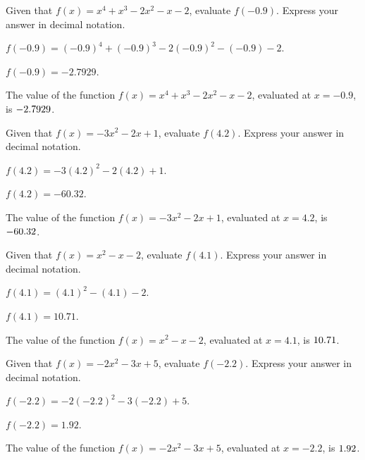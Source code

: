 \begin{shuffle}
\begin{exercise}
Given that $f(x)=x^4+x^3-2 x^2-x-2$, evaluate $f(-0.9)$. Express your answer in decimal notation.
\begin{solution}
\begin{hint}
$f(-0.9)=(-0.9)^4+(-0.9)^3-2 (-0.9)^2-(-0.9)-2$.
\end{hint}
\begin{hint}
$f(-0.9)=-2.7929$.
\end{hint}
The value of the function $f(x) = x^4+x^3-2 x^2-x-2$, evaluated at $x=-0.9$, is ${-2.7929}$.
\end{solution}
\end{exercise}

\begin{exercise}
Given that $f(x)=-3 x^2-2 x+1$, evaluate $f(4.2)$. Express your answer in decimal notation.
\begin{solution}
\begin{hint}
$f(4.2)=-3 (4.2)^2-2 (4.2)+1$.
\end{hint}
\begin{hint}
$f(4.2)=-60.32$.
\end{hint}
The value of the function $f(x) = -3 x^2-2 x+1$, evaluated at $x=4.2$, is ${-60.32}$.
\end{solution}
\end{exercise}

\begin{exercise}
Given that $f(x)=x^2-x-2$, evaluate $f(4.1)$. Express your answer in decimal notation.
\begin{solution}
\begin{hint}
$f(4.1)=(4.1)^2-(4.1)-2$.
\end{hint}
\begin{hint}
$f(4.1)=10.71$.
\end{hint}
The value of the function $f(x) = x^2-x-2$, evaluated at $x=4.1$, is ${10.71}$.
\end{solution}
\end{exercise}

\begin{exercise}
Given that $f(x)=-2 x^2-3 x+5$, evaluate $f(-2.2)$. Express your answer in decimal notation.
\begin{solution}
\begin{hint}
$f(-2.2)=-2 (-2.2)^2-3 (-2.2)+5$.
\end{hint}
\begin{hint}
$f(-2.2)=1.92$.
\end{hint}
The value of the function $f(x) = -2 x^2-3 x+5$, evaluated at $x=-2.2$, is ${1.92}$.
\end{solution}
\end{exercise}


\end{shuffle}
